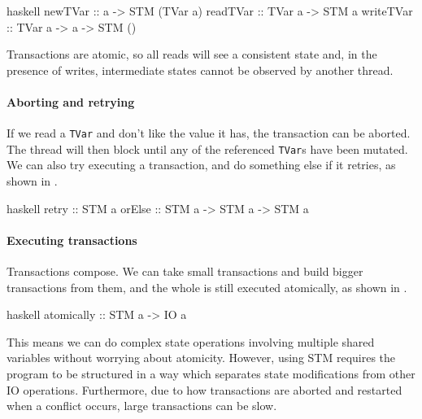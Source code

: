 \begin{listing}
\centering
\begin{cminted}{haskell}
newTVar   :: a -> STM (TVar a)
readTVar  :: TVar a -> STM a
writeTVar :: TVar a -> a -> STM ()
\end{cminted}
\caption{Transactional variables in Haskell.}\label{lst:tvars_haskell}
\end{listing}

Transactions are atomic, so all reads will see a consistent state and,
in the presence of writes, intermediate states cannot be observed by
another thread.

\paragraph{Aborting and retrying}
If we read a \verb|TVar| and don't like the value it has, the
transaction can be aborted.  The thread will then block until any of
the referenced \verb|TVar|s have been mutated.  We can also try
executing a transaction, and do something else if it retries, as shown
in .

\begin{listing}
\centering
\begin{cminted}{haskell}
retry  :: STM a
orElse :: STM a -> STM a -> STM a
\end{cminted}
\caption{Aborting and retrying transactions in Haskell.}\label{lst:orelse_haskell}
\end{listing}

\paragraph{Executing transactions}
Transactions compose.  We can take small transactions and build bigger
transactions from them, and the whole is still executed atomically, as
shown in .

\begin{listing}
\centering
\begin{cminted}{haskell}
atomically :: STM a -> IO a
\end{cminted}
\caption{Executing transactions in Haskell.}\label{lst:atomically_haskell}
\end{listing}

This means we can do complex state operations involving multiple
shared variables without worrying about atomicity.  However, using STM
requires the program to be structured in a way which separates state
modifications from other IO operations.  Furthermore, due to how
transactions are aborted and restarted when a conflict occurs, large
transactions can be slow\cite{le2015}.

